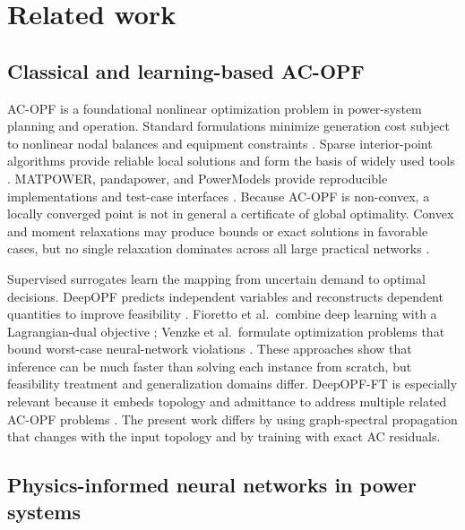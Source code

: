 \documentclass[final,5p,times,twocolumn]{elsarticle}
\begin{document}
\section{Related work}
\label{sec:related}

\subsection{Classical and learning-based AC-OPF}

AC-OPF is a foundational nonlinear optimization problem in power-system
planning and operation. Standard formulations minimize generation cost subject
to nonlinear nodal balances and equipment constraints
\cite{frank2016opf,capitanescu2016critical}. Sparse interior-point algorithms
provide reliable local solutions and form the basis of widely used tools
\cite{wachter2006ipopt}. MATPOWER, pandapower, and PowerModels provide
reproducible implementations and test-case interfaces
\cite{zimmerman2011matpower,thurner2018pandapower,coffrin2018powermodels}.
Because AC-OPF is non-convex, a locally converged point is not in general a
certificate of global optimality. Convex and moment relaxations may produce
bounds or exact solutions in favorable cases, but no single relaxation
dominates across all large practical networks \cite{molzahn2019survey,
zohrizadeh2020conic}.

Supervised surrogates learn the mapping from uncertain demand to optimal
decisions. DeepOPF predicts independent variables and reconstructs dependent
quantities to improve feasibility \cite{pan2021deepopf,pan2023acdeepopf}.
Fioretto et al.\ combine deep learning with a Lagrangian-dual objective
\cite{fioretto2020predicting}; Venzke et al.\ formulate optimization problems
that bound worst-case neural-network violations
\cite{venzke2020worstcase}. These approaches show that inference can be much
faster than solving each instance from scratch, but feasibility treatment and
generalization domains differ. DeepOPF-FT is especially relevant because it
embeds topology and admittance to address multiple related AC-OPF problems
\cite{zhou2023deepopfft}. The present work differs by using graph-spectral
propagation that changes with the input topology and by training with exact AC
residuals.

\subsection{Physics-informed neural networks in power systems}
\end{document}
